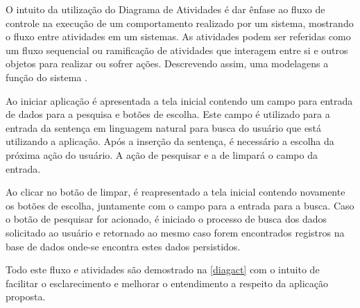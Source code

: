 O intuito da utilização do Diagrama de Atividades é dar ênfase ao fluxo de controle na execução de um comportamento realizado por um sistema, mostrando o fluxo entre atividades em um sistemas. As atividades podem ser referidas como um fluxo sequencial ou ramificação de atividades que interagem entre si e outros objetos para realizar ou sofrer ações. Descrevendo assim, uma modelagens a função do sistema \cite{Booch:2012}.  

Ao iniciar aplicação é apresentada a tela inicial contendo um campo para entrada de dados para a pesquisa e botões de escolha. Este campo é utilizado para a entrada da sentença em linguagem natural para busca do usuário que está utilizando a aplicação. Após a inserção da sentença, é necessário a escolha da próxima ação do usuário. A ação de pesquisar e a de limpará o campo da entrada.

Ao clicar no botão de limpar, é reapresentado a tela inicial contendo novamente os botões de escolha, juntamente com o campo para a entrada para a busca. Caso o botão de pesquisar for acionado, é iniciado o processo de busca dos dados solicitado ao usuário e retornado ao mesmo caso forem encontrados registros na base de dados onde-se encontra estes dados persistidos.

Todo este fluxo e atividades são demostrado na \autoref{diagact} com o intuito de facilitar o esclarecimento e melhorar o entendimento a respeito da aplicação proposta.
